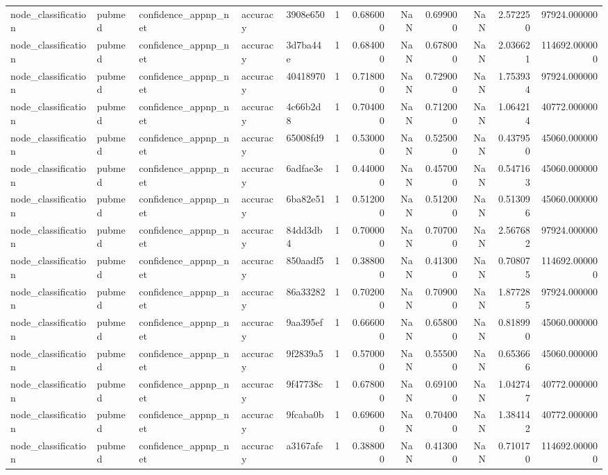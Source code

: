 \begin{tabular}{lllllrrrrrrr}
node_classification & pubmed & confidence_appnp_net & accuracy & 3908e650 & 1 & 0.686000 & NaN & 0.699000 & NaN & 2.572250 & 97924.000000 \\
node_classification & pubmed & confidence_appnp_net & accuracy & 3d7ba44e & 1 & 0.684000 & NaN & 0.678000 & NaN & 2.036621 & 114692.000000 \\
node_classification & pubmed & confidence_appnp_net & accuracy & 40418970 & 1 & 0.718000 & NaN & 0.729000 & NaN & 1.753934 & 97924.000000 \\
node_classification & pubmed & confidence_appnp_net & accuracy & 4c66b2d8 & 1 & 0.704000 & NaN & 0.712000 & NaN & 1.064214 & 40772.000000 \\
node_classification & pubmed & confidence_appnp_net & accuracy & 65008fd9 & 1 & 0.530000 & NaN & 0.525000 & NaN & 0.437950 & 45060.000000 \\
node_classification & pubmed & confidence_appnp_net & accuracy & 6adfae3e & 1 & 0.440000 & NaN & 0.457000 & NaN & 0.547163 & 45060.000000 \\
node_classification & pubmed & confidence_appnp_net & accuracy & 6ba82e51 & 1 & 0.512000 & NaN & 0.512000 & NaN & 0.513096 & 45060.000000 \\
node_classification & pubmed & confidence_appnp_net & accuracy & 84dd3db4 & 1 & 0.700000 & NaN & 0.707000 & NaN & 2.567682 & 97924.000000 \\
node_classification & pubmed & confidence_appnp_net & accuracy & 850aadf5 & 1 & 0.388000 & NaN & 0.413000 & NaN & 0.708075 & 114692.000000 \\
node_classification & pubmed & confidence_appnp_net & accuracy & 86a33282 & 1 & 0.702000 & NaN & 0.709000 & NaN & 1.877285 & 97924.000000 \\
node_classification & pubmed & confidence_appnp_net & accuracy & 9aa395ef & 1 & 0.666000 & NaN & 0.658000 & NaN & 0.818990 & 45060.000000 \\
node_classification & pubmed & confidence_appnp_net & accuracy & 9f2839a5 & 1 & 0.570000 & NaN & 0.555000 & NaN & 0.653666 & 45060.000000 \\
node_classification & pubmed & confidence_appnp_net & accuracy & 9f47738c & 1 & 0.678000 & NaN & 0.691000 & NaN & 1.042747 & 40772.000000 \\
node_classification & pubmed & confidence_appnp_net & accuracy & 9fcaba0b & 1 & 0.696000 & NaN & 0.704000 & NaN & 1.384142 & 40772.000000 \\
node_classification & pubmed & confidence_appnp_net & accuracy & a3167afe & 1 & 0.388000 & NaN & 0.413000 & NaN & 0.710170 & 114692.000000 \\

\end{tabular}
